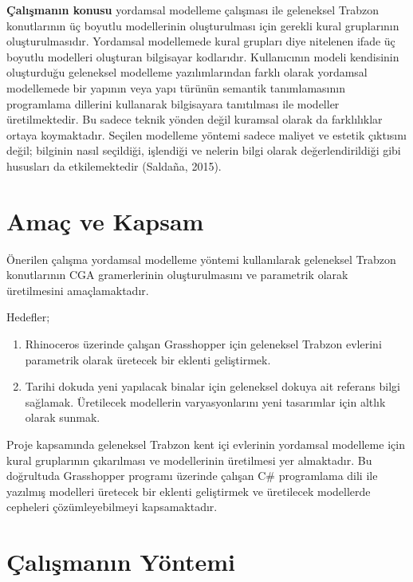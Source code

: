 \documentclass[12pt,turkish,a4paperpaper,]{report}
\begin{document}
\textbf{Çalışmanın konusu} yordamsal modelleme çalışması ile geleneksel
Trabzon konutlarının üç boyutlu modellerinin oluşturulması için gerekli
kural gruplarının oluşturulmasıdır. Yordamsal modellemede kural grupları
diye nitelenen ifade üç boyutlu modelleri oluşturan bilgisayar
kodlarıdır. Kullanıcının modeli kendisinin oluşturduğu geleneksel
modelleme yazılımlarından farklı olarak yordamsal modellemede bir
yapının veya yapı türünün semantik tanımlamasının programlama dillerini
kullanarak bilgisayara tanıtılması ile modeller üretilmektedir. Bu
sadece teknik yönden değil kuramsal olarak da farklılıklar ortaya
koymaktadır. Seçilen modelleme yöntemi sadece maliyet ve estetik
çıktısını değil; bilginin nasıl seçildiği, işlendiği ve nelerin bilgi
olarak değerlendirildiği gibi hususları da etkilemektedir (Saldaña,
2015).

\hypertarget{amauxe7-ve-kapsam}{%
\section{Amaç ve Kapsam}\label{amauxe7-ve-kapsam}}

Önerilen çalışma yordamsal modelleme yöntemi kullanılarak geleneksel
Trabzon konutlarının CGA gramerlerinin oluşturulmasını ve parametrik
olarak üretilmesini amaçlamaktadır.

Hedefler;

\begin{enumerate}
\def\labelenumi{\arabic{enumi}.}
\item
  Rhinoceros üzerinde çalışan Grasshopper için geleneksel Trabzon
  evlerini parametrik olarak üretecek bir eklenti geliştirmek.
\item
  Tarihi dokuda yeni yapılacak binalar için geleneksel dokuya ait
  referans bilgi sağlamak. Üretilecek modellerin varyasyonlarını yeni
  tasarımlar için altlık olarak sunmak.
\end{enumerate}

Proje kapsamında geleneksel Trabzon kent içi evlerinin yordamsal
modelleme için kural gruplarının çıkarılması ve modellerinin üretilmesi
yer almaktadır. Bu doğrultuda Grasshopper programı üzerinde çalışan C\#
programlama dili ile yazılmış modelleri üretecek bir eklenti geliştirmek
ve üretilecek modellerde cepheleri çözümleyebilmeyi kapsamaktadır.

\hypertarget{uxe7alux131ux15fmanux131n-yuxf6ntemi}{%
\section{Çalışmanın
Yöntemi}\label{uxe7alux131ux15fmanux131n-yuxf6ntemi}}
\end{document}
